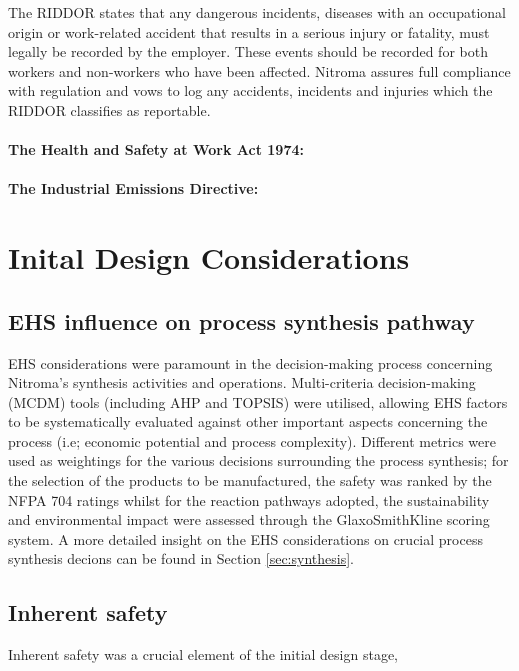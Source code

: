 The RIDDOR states that any dangerous incidents, diseases with an occupational origin or work-related accident that results in a serious injury or fatality, must legally be recorded by the employer. These events should be recorded for both workers and non-workers who have been affected. Nitroma assures full compliance with regulation and vows to log any accidents, incidents and injuries which the RIDDOR classifies as reportable.

\paragraph{The Health and Safety at Work Act 1974:}

\paragraph{The Industrial Emissions Directive:}
 
 
\section{Inital Design Considerations}

\subsection{EHS influence on process synthesis pathway}

EHS considerations were paramount in the decision-making process concerning Nitroma’s synthesis activities and operations. Multi-criteria decision-making (MCDM) tools (including AHP and TOPSIS) were utilised, allowing EHS factors to be systematically evaluated against other important aspects concerning the process (i.e; economic potential and process complexity). Different metrics were used as weightings for the various decisions surrounding the process synthesis; for the selection of the products to be manufactured, the safety was ranked by the NFPA 704 ratings whilst for the reaction pathways adopted, the sustainability and environmental impact were assessed through the GlaxoSmithKline scoring system. A more detailed insight on the EHS considerations on crucial process synthesis decions can be found in Section \ref{sec:synthesis}. 

\subsection{Inherent safety}

Inherent safety was a crucial element of the initial design stage, 


